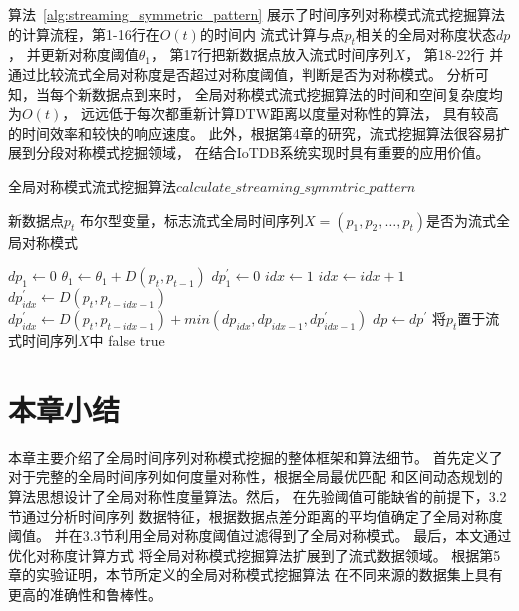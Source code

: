 算法~\ref{alg:streaming_symmetric_pattern}
展示了时间序列对称模式流式挖掘算法
的计算流程，第1-16行在$O(t)$的时间内
流式计算与点$p_t$相关的全局对称度状态$dp$，
并更新对称度阈值$\theta_1$，
第17行把新数据点放入流式时间序列$X$，
第18-22行
并通过比较流式全局对称度是否超过对称度阈值，判断是否为对称模式。
分析可知，当每个新数据点到来时，
全局对称模式流式挖掘算法的时间和空间复杂度均为$O(t)$，
远远低于每次都重新计算DTW距离以度量对称性的算法，
具有较高的时间效率和较快的响应速度。
此外，根据第4章的研究，流式挖掘算法很容易扩展到分段对称模式挖掘领域，
在结合IoTDB系统实现时具有重要的应用价值。

\renewcommand{\algorithmicrequire}{\textbf{输入：}\unskip}
\renewcommand{\algorithmicensure}{\textbf{输出：}\unskip}

\begin{algorithm}
  \caption{全局对称模式流式挖掘算法$calculate\_streaming\_symmtric\_pattern$}
  \label{alg:streaming_symmetric_pattern}
  \small
  \begin{algorithmic}
    \REQUIRE 新数据点$p_t$
    \ENSURE 布尔型变量，标志流式全局时间序列$X=\left(p_{1},p_{2},\dots,p_t \right)$是否为流式全局对称模式

      \STATE $dp_{1} \leftarrow 0$
    \ELSE
      \STATE $\theta_1 \leftarrow \theta_1+D\left(p_{t}, p_{t-1}\right)$
      \STATE $dp_1^{\prime} \leftarrow 0$
      \STATE $ idx \leftarrow 1$
        \STATE $ idx \leftarrow idx+1$
          \STATE $dp_{idx}^{\prime} \leftarrow D\left(p_{t}, p_{t-idx-1}\right)$
        \ELSE
          \STATE $dp_{idx}^{\prime} \leftarrow D\left(p_{t}, p_{t-idx-1}\right)+min(dp_{idx},dp_{idx-1},dp_{idx-1}^{\prime})$
        \ENDIF
      \ENDWHILE
      \STATE $ dp \leftarrow dp^{\prime}$
    \ENDIF
    \STATE 将$p_t$置于流式时间序列$X$中
      \RETURN false
    \ELSE
      \RETURN true
    \ENDIF
  \end{algorithmic}
\end{algorithm}

\section{本章小结}
本章主要介绍了全局时间序列对称模式挖掘的整体框架和算法细节。
首先定义了对于完整的全局时间序列如何度量对称性，根据全局最优匹配
和区间动态规划的算法思想设计了全局对称性度量算法。然后，
在先验阈值可能缺省的前提下，3.2节通过分析时间序列
数据特征，根据数据点差分距离的平均值确定了全局对称度阈值。
并在3.3节利用全局对称度阈值过滤得到了全局对称模式。
最后，本文通过优化对称度计算方式
将全局对称模式挖掘算法扩展到了流式数据领域。
根据第5章的实验证明，本节所定义的全局对称模式挖掘算法
在不同来源的数据集上具有更高的准确性和鲁棒性。